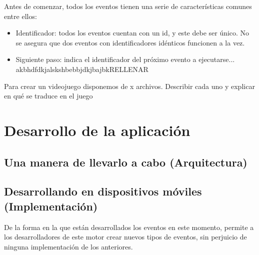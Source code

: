 Antes de comenzar, todos los eventos tienen una serie de características comunes entre ellos:

\begin{itemize}
	\item Identificador: todos los eventos cuentan con un id, y este debe ser único. No se asegura que dos eventos con identificadores idénticos funcionen a la vez.
	\item Siguiente paso: indica el identificador del próximo evento a ejecutarse...
	akbhdfdkjalskshbebbjdkjbajbkRELLENAR
\end{itemize}

Para crear un videojuego disponemos de x archivos.
Describir cada uno y explicar en qué se traduce en el juego



\chapter{Desarrollo de la aplicación} \label{applicationImplementation}

\section{Una manera de llevarlo a cabo (Arquitectura)}

\section{Desarrollando en dispositivos móviles (Implementación)}

De la forma en la que están desarrollados los eventos en este momento, permite a los desarrolladores de este motor crear nuevos tipos de eventos, sin perjuicio de ninguna implementación de los anteriores.
